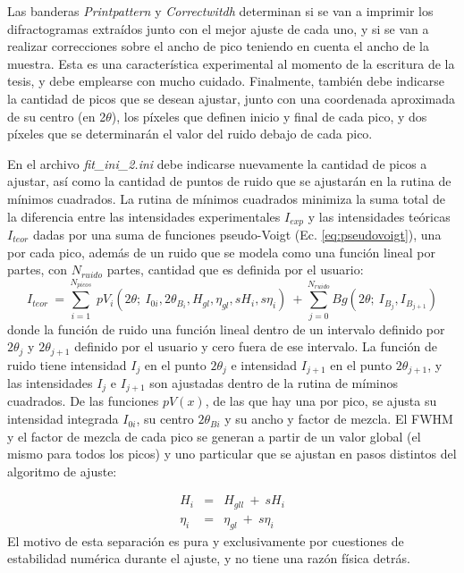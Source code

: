 Las banderas \textit{Printpattern} y \textit{Correctwitdh} determinan si se van a imprimir los difractogramas extraídos junto con el mejor ajuste de cada uno, y si se van a realizar correcciones sobre el ancho de pico teniendo en cuenta el ancho de la muestra.
Esta es una característica experimental al momento de la escritura de la tesis, y debe emplearse con mucho cuidado.
Finalmente, también debe indicarse la cantidad de picos que se desean ajustar, junto con una coordenada aproximada de su centro (en 2$\theta$), los píxeles que definen inicio y final de cada pico, y dos píxeles que se determinarán el valor del ruido debajo de cada pico.

En el archivo \textit{fit\_ini\_2.ini} debe indicarse nuevamente la cantidad de picos a ajustar, así como la cantidad de puntos de ruido que se ajustarán en la rutina de mínimos cuadrados.
La rutina de mínimos cuadrados minimiza la suma total de la diferencia entre las intensidades experimentales $I_{exp}$ y las intensidades teóricas $I_{teor}$ dadas por una suma de funciones pseudo-Voigt (Ec. \ref{eq:pseudovoigt}), una por cada pico, además de un ruido que se modela como una función lineal por partes, con $N_{ruido}$ partes, cantidad que es definida por el usuario:
\begin{equation}
  I_{teor} \ = \sum_{i=1}^{N_{picos}} \ pV_i (2\theta; \ I_{0i}, 2\theta_{B_i}, H_{gl}, \eta_{gl}, sH_i, s\eta_i) \ + \sum_{j=0}^{N_{ruido}} Bg(2\theta; \ I_{B_j}, I_{B_{j+1}})
  \label{eq:Iteor}
\end{equation}
\noindent
donde la función de ruido una función lineal dentro de un intervalo definido por $2\theta_j$ y $2\theta_{j+1}$ definido por el usuario y cero fuera de ese intervalo.
La función de ruido tiene intensidad $I_j$ en el punto $2\theta_j$ e intensidad $I_{j+1}$ en el punto $2\theta_{j+1}$, y las intensidades $I_j$ e $I_{j+1}$ son ajustadas dentro de la rutina de míminos cuadrados.
De las funciones $pV(x)$, de las que hay una por pico, se ajusta su intensidad integrada $I_{0i}$, su centro $2\theta_{Bi}$ y su ancho y factor de mezcla.
El FWHM y el factor de mezcla de cada pico se generan a partir de un valor global (el mismo para todos los picos) y uno particular que se ajustan en pasos distintos del algoritmo de ajuste:

\begin{eqnarray}
  H_i & = & H_{gll} \ + \ sH_i \\
  \eta_i & = & \eta_{gl} \ + \ s\eta_i
  \label{eq:global}
\end{eqnarray}
\noindent
El motivo de esta separación es pura y exclusivamente por cuestiones de estabilidad numérica durante el ajuste, y no tiene una razón física detrás.


